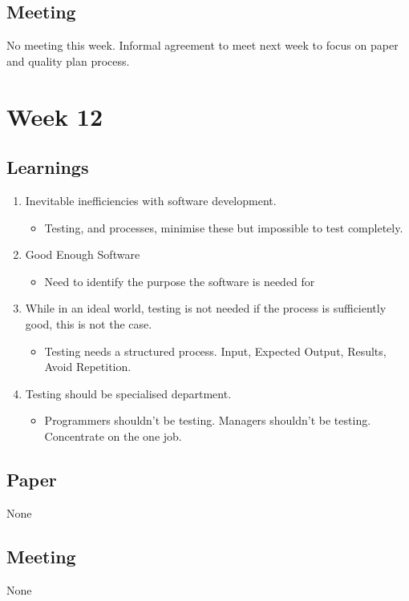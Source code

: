 \section{Meeting}

No meeting this week. Informal agreement to meet next week to focus on paper and quality plan process.

\chapter{Week 12}

\section{Learnings}
\begin{enumerate}
\item Inevitable inefficiencies with software development. 
\begin{itemize}
\item Testing, and processes, minimise these but impossible to test completely.
\end{itemize}
\item Good Enough Software
\begin{itemize}
\item Need to identify the purpose the software is needed for
\end{itemize}
\item While in an ideal world, testing is not needed if the process is sufficiently good, this is not the case.
\begin{itemize}
\item Testing needs a structured process. Input, Expected Output, Results, Avoid Repetition.
\end{itemize}
\item Testing should be specialised department.
\begin{itemize}
\item Programmers shouldn't be testing. Managers shouldn't be testing. Concentrate on the one job.
\end{itemize}
\end{enumerate}

\section{Paper}

None

\section{Meeting}

None
